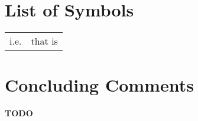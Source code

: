 \documentclass[11pt,a4paper,oneside]{book}	%
\begin{document}
\chapter{List of Symbols}

\begin{tabular}{ll}

i.e. & that is\\

\end{tabular}

\mainmatter











\backmatter

\chapter{Concluding Comments}\label{chapter:Conclusions}


\textbf{TODO}



\end{document}

